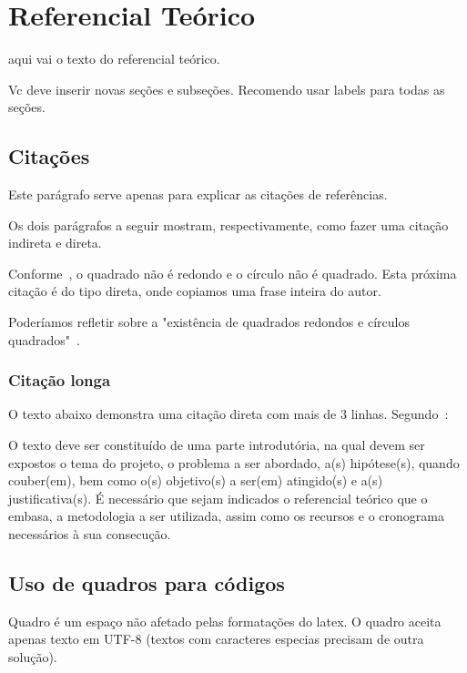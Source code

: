 \chapter[\label{ch:ref}Referencial Teórico]{Referencial Teórico}
aqui vai o texto do referencial teórico. 

Vc deve inserir novas seções e subseções. Recomendo usar labels para todas as seções.

\section{\label{sec:citacao}Citações}

Este parágrafo serve apenas para explicar as citações de referências. 

Os dois parágrafos a seguir mostram, respectivamente, como fazer uma citação indireta e direta. 

Conforme~, o quadrado não é redondo e o círculo não é quadrado. Esta próxima citação é do tipo direta, onde copiamos uma frase inteira do autor. 

Poderíamos refletir sobre a "existência de quadrados redondos e círculos quadrados"~\cite{ericson2004real}. 


\subsection{\label{subsec:citacaoLonga}Citação longa}

O texto abaixo demonstra uma citação direta com mais de 3 linhas. Segundo~\cite{ericson2004real}:

\begin{citacao}
	O texto deve ser constituído de uma parte introdutória, na qual devem ser
	expostos o tema do projeto, o problema a ser abordado, a(s) hipótese(s),
	quando couber(em), bem como o(s) objetivo(s) a ser(em) atingido(s) e a(s)
	justificativa(s). É necessário que sejam indicados o referencial teórico que
	o embasa, a metodologia a ser utilizada, assim como os recursos e o cronograma
	necessários à sua consecução.
\end{citacao}


\section{\label{sec:quadros}Uso de quadros para códigos}

Quadro é um espaço não afetado pelas formatações do latex. O quadro aceita apenas texto em UTF-8 (textos com caracteres especias precisam de outra solução).

